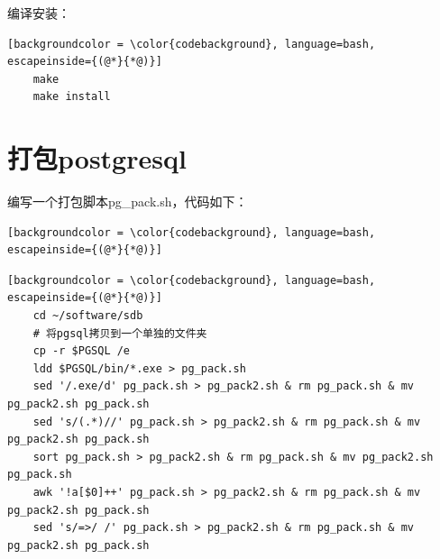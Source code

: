 编译安装：

\begin{lstlisting}[backgroundcolor = \color{codebackground}, language=bash, escapeinside={(@*}{*@)}]
	make	
	make install
\end{lstlisting}

\section{打包postgresql}

编写一个打包脚本pg_pack.sh，代码如下：
\begin{lstlisting}[backgroundcolor = \color{codebackground}, language=bash, escapeinside={(@*}{*@)}]
\end{lstlisting}

\begin{lstlisting}[backgroundcolor = \color{codebackground}, language=bash, escapeinside={(@*}{*@)}]
	cd ~/software/sdb
	# 将pgsql拷贝到一个单独的文件夹
	cp -r $PGSQL /e
	ldd $PGSQL/bin/*.exe > pg_pack.sh
	sed '/.exe/d' pg_pack.sh > pg_pack2.sh & rm pg_pack.sh & mv pg_pack2.sh pg_pack.sh
	sed 's/(.*)//' pg_pack.sh > pg_pack2.sh & rm pg_pack.sh & mv pg_pack2.sh pg_pack.sh
	sort pg_pack.sh > pg_pack2.sh & rm pg_pack.sh & mv pg_pack2.sh pg_pack.sh
	awk '!a[$0]++' pg_pack.sh > pg_pack2.sh & rm pg_pack.sh & mv pg_pack2.sh pg_pack.sh
	sed 's/=>/ /' pg_pack.sh > pg_pack2.sh & rm pg_pack.sh & mv pg_pack2.sh pg_pack.sh
	
	
\end{lstlisting}